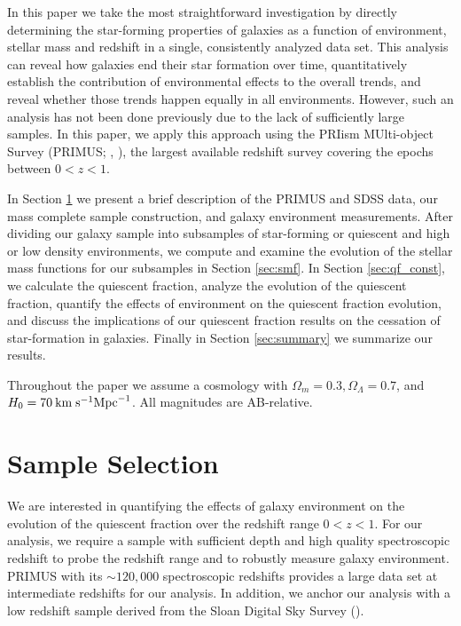 \documentclass{emulateapj}
\begin{document}

In this paper we take the most straightforward investigation
by directly determining the star-forming properties of galaxies
as a function of environment, stellar mass and redshift in a single,
consistently analyzed data set. This analysis can reveal how galaxies
end their star formation over time, quantitatively establish the
contribution of environmental effects to the overall trends, and
reveal whether those trends happen equally in all environments.
However, such an analysis has not been done previously due to the lack
of sufficiently large samples. In this paper, we apply this approach
using the PRIism MUlti-object Survey (PRIMUS; \citealt{Coil:2011aa},
\citealt{Cool:2013aa}), the largest available redshift survey covering
the epochs between $0<z<1$.

In Section \ref{sec:sample} we present a brief description of the
PRIMUS and SDSS data, our mass complete sample construction, and
galaxy environment measurements. After dividing our galaxy sample into
subsamples of star-forming or quiescent and high or low density
environments, we compute and examine the evolution of the stellar mass
functions for our subsamples in Section \ref{sec:smf}. In
Section \ref{sec:qf_const}, we calculate the quiescent fraction,
analyze the evolution of the quiescent fraction, quantify the effects
of environment on the quiescent fraction evolution, and discuss the
implications of our quiescent fraction results on the cessation of
star-formation in galaxies. Finally in Section \ref{sec:summary} we
summarize our results.

Throughout the paper we assume a cosmology with $\Omega_{m} = 0.3,
\Omega_{\Lambda} = 0.7$, and $H_0 = 70 \: \rm{km} \; \rm{s}^{-1}
\rm{Mpc}^{-1}$. All magnitudes are AB-relative. 

\section{Sample Selection} \label{sec:sample}
We are interested in quantifying the effects of galaxy environment on
the evolution of the quiescent fraction over the redshift range $0 < z < 1$. For our analysis, we require a sample with sufficient depth and high quality spectroscopic redshift to probe the redshift range and to robustly measure galaxy environment. PRIMUS with its $\sim 120,000$ spectroscopic redshifts provides a large data set at intermediate redshifts for our analysis. In addition, we anchor our analysis with a low redshift sample derived from the Sloan Digital Sky Survey (\citealt{York:2000aa}). 
\end{document}
